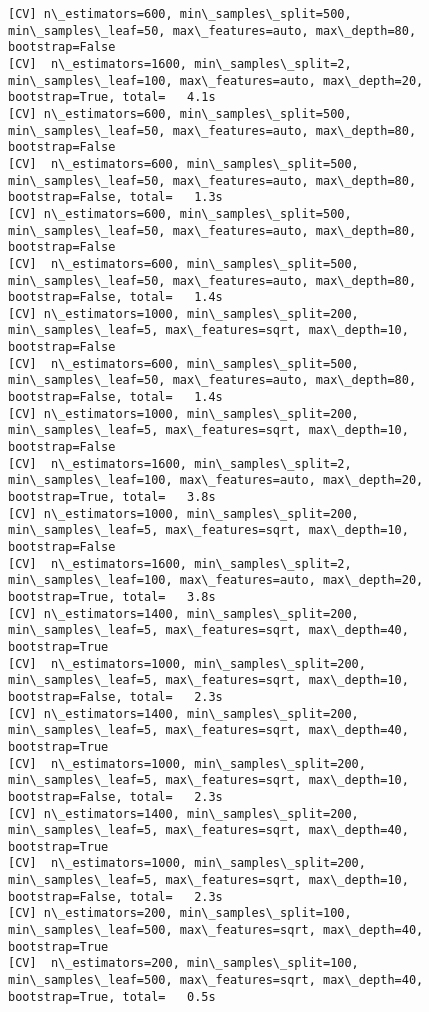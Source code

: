 \documentclass[11pt]{article}
\begin{document}
\begin{Verbatim}[commandchars=\\\{\}]
[CV] n\_estimators=600, min\_samples\_split=500, min\_samples\_leaf=50, max\_features=auto, max\_depth=80, bootstrap=False 
[CV]  n\_estimators=1600, min\_samples\_split=2, min\_samples\_leaf=100, max\_features=auto, max\_depth=20, bootstrap=True, total=   4.1s
[CV] n\_estimators=600, min\_samples\_split=500, min\_samples\_leaf=50, max\_features=auto, max\_depth=80, bootstrap=False 
[CV]  n\_estimators=600, min\_samples\_split=500, min\_samples\_leaf=50, max\_features=auto, max\_depth=80, bootstrap=False, total=   1.3s
[CV] n\_estimators=600, min\_samples\_split=500, min\_samples\_leaf=50, max\_features=auto, max\_depth=80, bootstrap=False 
[CV]  n\_estimators=600, min\_samples\_split=500, min\_samples\_leaf=50, max\_features=auto, max\_depth=80, bootstrap=False, total=   1.4s
[CV] n\_estimators=1000, min\_samples\_split=200, min\_samples\_leaf=5, max\_features=sqrt, max\_depth=10, bootstrap=False 
[CV]  n\_estimators=600, min\_samples\_split=500, min\_samples\_leaf=50, max\_features=auto, max\_depth=80, bootstrap=False, total=   1.4s
[CV] n\_estimators=1000, min\_samples\_split=200, min\_samples\_leaf=5, max\_features=sqrt, max\_depth=10, bootstrap=False 
[CV]  n\_estimators=1600, min\_samples\_split=2, min\_samples\_leaf=100, max\_features=auto, max\_depth=20, bootstrap=True, total=   3.8s
[CV] n\_estimators=1000, min\_samples\_split=200, min\_samples\_leaf=5, max\_features=sqrt, max\_depth=10, bootstrap=False 
[CV]  n\_estimators=1600, min\_samples\_split=2, min\_samples\_leaf=100, max\_features=auto, max\_depth=20, bootstrap=True, total=   3.8s
[CV] n\_estimators=1400, min\_samples\_split=200, min\_samples\_leaf=5, max\_features=sqrt, max\_depth=40, bootstrap=True 
[CV]  n\_estimators=1000, min\_samples\_split=200, min\_samples\_leaf=5, max\_features=sqrt, max\_depth=10, bootstrap=False, total=   2.3s
[CV] n\_estimators=1400, min\_samples\_split=200, min\_samples\_leaf=5, max\_features=sqrt, max\_depth=40, bootstrap=True 
[CV]  n\_estimators=1000, min\_samples\_split=200, min\_samples\_leaf=5, max\_features=sqrt, max\_depth=10, bootstrap=False, total=   2.3s
[CV] n\_estimators=1400, min\_samples\_split=200, min\_samples\_leaf=5, max\_features=sqrt, max\_depth=40, bootstrap=True 
[CV]  n\_estimators=1000, min\_samples\_split=200, min\_samples\_leaf=5, max\_features=sqrt, max\_depth=10, bootstrap=False, total=   2.3s
[CV] n\_estimators=200, min\_samples\_split=100, min\_samples\_leaf=500, max\_features=sqrt, max\_depth=40, bootstrap=True 
[CV]  n\_estimators=200, min\_samples\_split=100, min\_samples\_leaf=500, max\_features=sqrt, max\_depth=40, bootstrap=True, total=   0.5s

\end{Verbatim}
\end{document}
